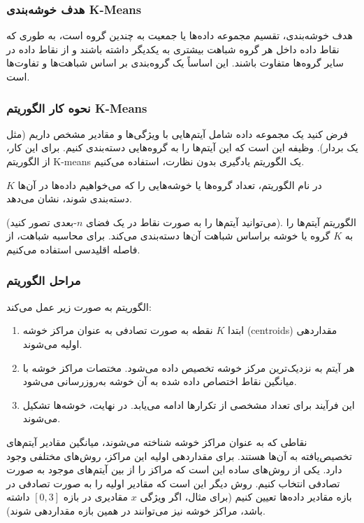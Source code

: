 \documentclass[a4paper,12pt,openany]{report}
\begin{document}
	   \subsubsection*{هدف خوشه‌بندی  K-Means}
	   
	   هدف خوشه‌بندی، تقسیم مجموعه داده‌ها یا جمعیت به چندین گروه است، به طوری که نقاط داده داخل هر گروه شباهت بیشتری به یکدیگر داشته باشند و از نقاط داده در سایر گروه‌ها متفاوت باشند. این اساساً یک گروه‌بندی بر اساس شباهت‌ها و تفاوت‌ها است.
	   
	   \subsubsection*{نحوه کار الگوریتم  K-Means}
	   
	   فرض کنید یک مجموعه داده شامل آیتم‌هایی با ویژگی‌ها و مقادیر مشخص داریم (مثل یک بردار). وظیفه این است که این آیتم‌ها را به گروه‌هایی دسته‌بندی کنیم. برای این کار، از الگوریتم K-means یک الگوریتم یادگیری بدون نظارت، استفاده می‌کنیم. 
	   
	   \( K \) در نام الگوریتم، تعداد گروه‌ها یا خوشه‌هایی را که می‌خواهیم داده‌ها در آن‌ها دسته‌بندی شوند، نشان می‌دهد.
	   
	   (می‌توانید آیتم‌ها را به صورت نقاط در یک فضای \( n \)-بعدی تصور کنید). الگوریتم آیتم‌ها را به \( K \) گروه یا خوشه براساس شباهت آن‌ها دسته‌بندی می‌کند. برای محاسبه شباهت، از فاصله اقلیدسی استفاده می‌کنیم.
	   
	   \subsubsection*{مراحل الگوریتم}
	   
	   الگوریتم به صورت زیر عمل می‌کند:
	   \begin{enumerate}
	   	\item ابتدا \( K \) نقطه به صورت تصادفی به عنوان مراکز خوشه (centroids) مقداردهی اولیه می‌شوند.
	   	\item هر آیتم به نزدیک‌ترین مرکز خوشه تخصیص داده می‌شود. مختصات مراکز خوشه با میانگین نقاط اختصاص داده شده به آن خوشه به‌روزرسانی می‌شود.
	   	\item این فرآیند برای تعداد مشخصی از تکرارها ادامه می‌یابد. در نهایت، خوشه‌ها تشکیل می‌شوند.
	   \end{enumerate}
	   
	   نقاطی که به عنوان مراکز خوشه شناخته می‌شوند، میانگین مقادیر آیتم‌های تخصیص‌یافته به آن‌ها هستند. برای مقداردهی اولیه این مراکز، روش‌های مختلفی وجود دارد. یکی از روش‌های ساده این است که مراکز را از بین آیتم‌های موجود به صورت تصادفی انتخاب کنیم. روش دیگر این است که مقادیر اولیه را به صورت تصادفی در بازه مقادیر داده‌ها تعیین کنیم (برای مثال، اگر ویژگی \( x \) مقادیری در بازه \([0, 3]\) داشته باشد، مراکز خوشه نیز می‌توانند در همین بازه مقداردهی شوند).
	   
\end{document}
